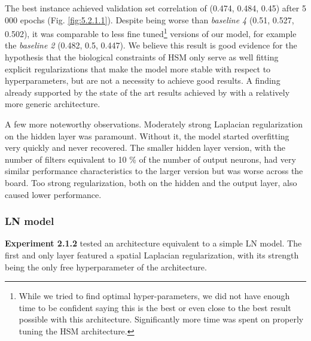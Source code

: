 The best instance achieved validation set correlation of (0.474, 0.484, 0.45) after 5 000 epochs (Fig. \ref{fig:5.2.1.1}). Despite being worse than \textit{baseline 4} (0.51, 0.527, 0.502), it was comparable to less fine tuned\footnote{While we tried to find optimal hyper-parameters, we did not have enough time to be confident saying this is the best or even close to the best result possible with this architecture. Significantly more time was spent on properly tuning the HSM architecture.} versions of our model, for example the \textit{baseline 2} (0.482, 0.5, 0.447). We believe this result is good evidence for the hypothesis that the biological constraints of HSM only serve as well fitting explicit regularizations that make the model more stable with respect to hyperparameters, but are not a necessity to achieve good results. A finding already supported by the state of the art results achieved by \cite{klindt} with a relatively more generic architecture.

A few more noteworthy observations. Moderately strong Laplacian regularization on the hidden layer was paramount. Without it, the model started overfitting very quickly and never recovered. The smaller hidden layer version, with the number of filters equivalent to 10 \% of the number of output neurons, had very similar performance characteristics to the larger version but was worse across the board. Too strong regularization, both on the hidden and the output layer, also caused lower performance.

\subsubsection{LN model}

\textbf{Experiment 2.1.2} tested an architecture equivalent to a simple LN model. The first and only layer featured a spatial Laplacian regularization, with its strength being the only free hyperparameter of the architecture. 

